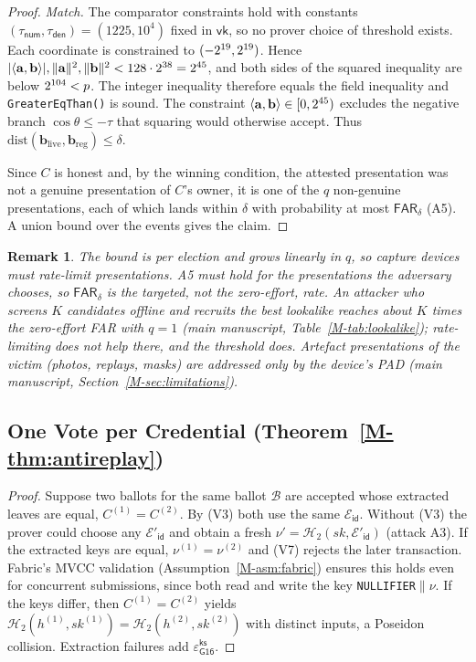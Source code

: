 \documentclass[10pt,letterpaper,journal]{IEEEtran}
\newtheorem{remark}[theorem]{Remark}
\begin{document}
\begin{proof}
\emph{Match.} The comparator constraints hold with constants $(\tau_{\mathsf{num}}, \tau_{\mathsf{den}}) = (1225, 10^4)$ fixed in $\mathsf{vk}$, so no prover choice of threshold exists. Each coordinate is constrained to $(-2^{19}, 2^{19})$. Hence $|\langle \mathbf{a}, \mathbf{b} \rangle|, \|\mathbf{a}\|^2, \|\mathbf{b}\|^2 < 128 \cdot 2^{38} = 2^{45}$, and both sides of the squared inequality are below $2^{104} < p$. The integer inequality therefore equals the field inequality and \texttt{GreaterEqThan(\nCmpBits)} is sound. The constraint $\langle \mathbf{a}, \mathbf{b} \rangle \in [0, 2^{45})$ excludes the negative branch $\cos\theta \leq -\tau$ that squaring would otherwise accept. Thus $\mathrm{dist}(\mathbf{b}_{\text{live}}, \mathbf{b}_{\text{reg}}) \leq \delta$.

Since $C$ is honest and, by the winning condition, the attested presentation was not a genuine presentation of $C$'s owner, it is one of the $q$ non-genuine presentations, each of which lands within $\delta$ with probability at most $\mathsf{FAR}_\delta$ (A5). A union bound over the events gives the claim.
\end{proof}

\begin{remark}
The bound is per election and grows linearly in $q$, so capture devices must rate-limit presentations. A5 must hold for the presentations the adversary \emph{chooses}, so $\mathsf{FAR}_\delta$ is the targeted, not the zero-effort, rate. An attacker who screens $K$ candidates offline and recruits the best lookalike reaches about $K$ times the zero-effort FAR with $q = 1$ (main manuscript, Table~\ref{M-tab:lookalike}); rate-limiting does not help there, and the threshold does. Artefact presentations of the victim (photos, replays, masks) are addressed only by the device's PAD (main manuscript, Section~\ref{M-sec:limitations}).
\end{remark}

\subsection{One Vote per Credential (Theorem~\ref{M-thm:antireplay})}
\label{sec:supp-proof-antireplay}

\begin{proof}
Suppose two ballots for the same ballot $\mathcal{B}$ are accepted whose extracted leaves are equal, $C^{(1)} = C^{(2)}$. By (V3) both use the same $\mathcal{E}_{\mathsf{id}}$. Without (V3) the prover could choose any $\mathcal{E}'_{\mathsf{id}}$ and obtain a fresh $\nu' = \mathcal{H}_2(sk, \mathcal{E}'_{\mathsf{id}})$ (attack A3). If the extracted keys are equal, $\nu^{(1)} = \nu^{(2)}$ and (V7) rejects the later transaction. Fabric's MVCC validation (Assumption~\ref{M-asm:fabric}) ensures this holds even for concurrent submissions, since both read and write the key \texttt{NULLIFIER}$\|\nu$. If the keys differ, then $C^{(1)} = C^{(2)}$ yields $\mathcal{H}_2(h^{(1)}, sk^{(1)}) = \mathcal{H}_2(h^{(2)}, sk^{(2)})$ with distinct inputs, a Poseidon collision. Extraction failures add $\varepsilon^{\mathsf{ks}}_{\mathsf{G16}}$.
\end{proof}
\end{document}
